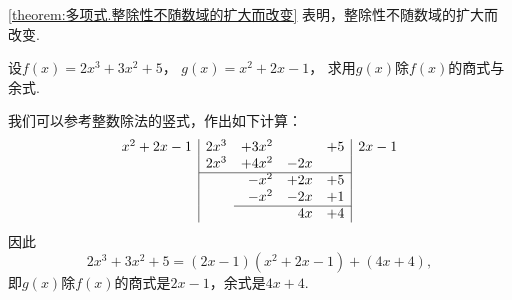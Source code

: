 \cref{theorem:多项式.整除性不随数域的扩大而改变} 表明，整除性不随数域的扩大而改变.

\begin{example}
设\(f(x) = 2x^3+3x^2+5\)，
\(g(x) = x^2+2x-1\)，
求用\(g(x)\)除\(f(x)\)的商式与余式.
\begin{solution}
我们可以参考整数除法的竖式，作出如下计算：
\[
	\begin{array}{r|*4r|l}
		x^2+2x-1 &
		2x^3 & +3x^2 & & +5
		& 2x-1 \\
		& 2x^3 & +4x^2 & -2x & \\ \cline{2-5}
		& & -x^2 & +2x & +5 \\
		& & -x^2 & -2x & +1 \\ \cline{3-5}
		& & & 4x & +4
	\end{array}
\]
因此\[
	2x^3+3x^2+5=(2x-1)(x^2+2x-1)+(4x+4),
\]
即\(g(x)\)除\(f(x)\)的商式是\(2x-1\)，余式是\(4x+4\).
\end{solution}
\end{example}
